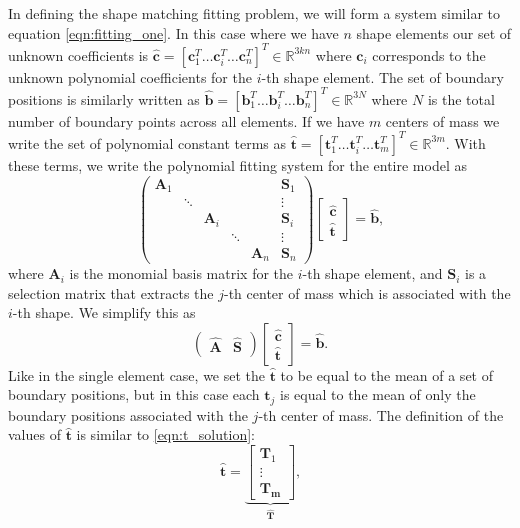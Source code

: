 In defining the shape matching fitting problem, we will form a system similar to equation \ref{eqn:fitting_one}. In this case where we have $n$ shape elements our set of unknown coefficients is $\hat{\mathbf{c}} = \left[\mathbf{c}_1^T \dots \mathbf{c}_i^T \dots \mathbf{c}_n^T \right]^T \in \mathbb{R}^{3kn}$ where $\mathbf{c}_i$ corresponds to the unknown polynomial coefficients for the $i$-th shape element. The set of boundary positions is similarly written as $\hat{\mathbf{b}}=\left[\mathbf{b}_1^T \dots \mathbf{b}_i^T \dots \mathbf{b}_n^T \right]^T \in \mathbb{R}^{3N}$ where $N$ is the total number of boundary points across all elements. If we have $m$ centers of mass we write the set of polynomial constant terms as $\hat{\mathbf{t}} = \left[\mathbf{t}_1^T \dots \mathbf{t}_i^T \dots \mathbf{t}_m^T \right]^T \in \mathbb{R}^{3m}$. With these terms, we write the polynomial fitting system for the entire model as
\begin{equation}
\begin{pmatrix}
 \mathbf{A}_1 &      &			  &			&				&\mathbf{S}_1\\  
 &            \ddots &            &  		&				&\vdots\\ 
 &            &      \mathbf{A}_i &   		&				&\mathbf{S}_i\\
 &            &      &            \ddots	&				&\vdots\\
 &            &      &            &			\mathbf{A}_n	&\mathbf{S}_n
\end{pmatrix}
\begin{bmatrix}
 \hat{\mathbf{c}}  \\ 
 \hat{\mathbf{t}}   
\end{bmatrix}
=
\hat{\mathbf{b}}
\text{,}
\end{equation}
where $\mathbf{A}_i$ is the monomial basis matrix for the $i$-th shape element, and $\mathbf{S}_i$ is a selection matrix that extracts the $j$-th center of mass which is associated with the $i$-th shape. We simplify this as
\begin{equation}
\begin{pmatrix}
\hat{\mathbf{A}} & \hat{\mathbf{S}}
\end{pmatrix}
\begin{bmatrix}
 \hat{\mathbf{c}}  \\ 
 \hat{\mathbf{t}}   
\end{bmatrix}
=
\hat{\mathbf{b}}
\text{.}
\end{equation}
Like in the single element case, we set the $\hat{\mathbf{t}}$ to be equal to the mean of a set of boundary positions, but in this case each $\mathbf{t}_j$ is equal to the mean of only the boundary positions associated with the $j$-th center of mass. The definition of the values of $\hat{\mathbf{t}}$ is similar to \ref{eqn:t_solution}:
\begin{equation}
\hat{\mathbf{t}} =
\underbrace{
\begin{bmatrix}
\mathbf{T}_1 \\ 
\vdots       \\
\mathbf{T_m}
\end{bmatrix}}_{\hat{\mathbf{T}}}
\text{,}
\end{equation}

